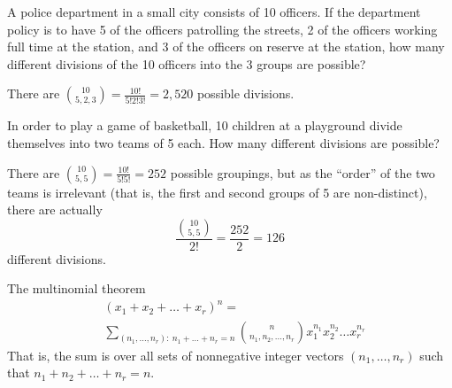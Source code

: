 \begin{changebar}
    
    \begin{example}
        A police department in a small city consists of 10 officers. If the department policy is to have 5 of the officers patrolling the streets, 2 of the officers working full time at the station, and 3 of the officers on reserve at the station, how many different divisions of the 10 officers into the 3 groups are possible?
    \end{example}
    \begin{solution}
        There are ${10 \choose 5,2,3} = \frac{10!}{5!2!3!} = 2{,}520$ possible divisions.
    \end{solution}
\end{changebar}
    
\begin{changebar}
    \begin{example}
        In order to play a game of basketball, 10 children at a playground divide themselves into two teams of 5 each. How many different divisions are possible?
    \end{example}
    \begin{solution}
        There are ${10 \choose 5,5} = \frac{10!}{5!5!} = 252$ possible groupings, but as the ``order'' of the two teams is irrelevant (that is, the first and second groups of 5 are non-distinct), there are actually \[
            \frac{{10 \choose 5,5}}{2!} = \frac{252}{2} = 126    
            \] different divisions.
        \end{solution}
\end{changebar}

\begin{bdef}{The multinomial theorem}
    \[\begin{aligned}
        &(x_1+x_2+\dots+x_r)^n = \\
        &\sum_{(n_1,\dots,n_r):\: n_1+\dots+n_r = n} {n \choose n_1,n_2,\dots,n_r} x_1^{n_1}x_2^{n_2}\dots x_r^{n_r}
    \end{aligned}\]
    That is, the sum is over all sets of nonnegative integer vectors $(n_1, \dots, n_r)$ such that $n_1 + n_2 + \dots + n_r = n$.
\end{bdef}